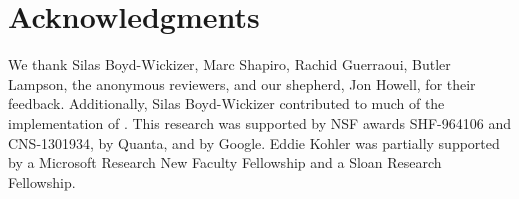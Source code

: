 \section*{Acknowledgments}

We thank Silas Boyd-Wickizer, Marc Shapiro, Rachid Guerraoui,
Butler Lampson, the anonymous reviewers, and our
shepherd, Jon Howell, for their feedback.
%
Additionally, Silas Boyd-Wickizer contributed to much of the
implementation of \sys.
%
This research was supported by NSF awards SHF-964106 and CNS-1301934,
by Quanta, and by Google. Eddie Kohler was partially supported by a
Microsoft Research New Faculty Fellowship and a Sloan Research
Fellowship.
